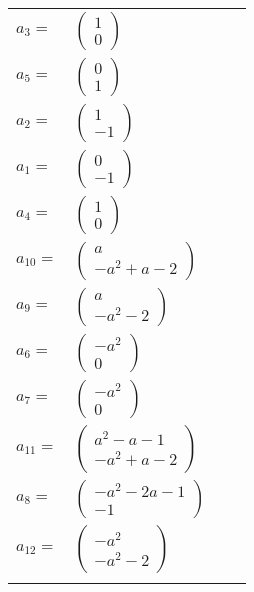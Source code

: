 \documentclass[1p]{elsarticle_modified}
\theoremstyle{definition}
\begin{document}
\begin{tabular}{m{7pt} m{180pt} m{7pt} m{180pt} }
\flushright $a_{3}=$&$\begin{pmatrix}1\\0\end{pmatrix}$ \\
\flushright $a_{5}=$&$\begin{pmatrix}0\\1\end{pmatrix}$ \\
\flushright $a_{2}=$&$\begin{pmatrix}1\\-1\end{pmatrix}$ \\
\flushright $a_{1}=$&$\begin{pmatrix}0\\-1\end{pmatrix}$ \\
\flushright $a_{4}=$&$\begin{pmatrix}1\\0\end{pmatrix}$ \\
\flushright $a_{10}=$&$\begin{pmatrix}a\\- a^2+a-2\end{pmatrix}$ \\
\flushright $a_{9}=$&$\begin{pmatrix}a\\- a^2-2\end{pmatrix}$ \\
\flushright $a_{6}=$&$\begin{pmatrix}- a^2\\0\end{pmatrix}$ \\
\flushright $a_{7}=$&$\begin{pmatrix}- a^2\\0\end{pmatrix}$ \\
\flushright $a_{11}=$&$\begin{pmatrix}a^2- a-1\\- a^2+a-2\end{pmatrix}$ \\
\flushright $a_{8}=$&$\begin{pmatrix}- a^2-2 a-1\\-1\end{pmatrix}$ \\
\flushright $a_{12}=$&$\begin{pmatrix}- a^2\\- a^2-2\end{pmatrix}$\\&\end{tabular}
\end{document}
